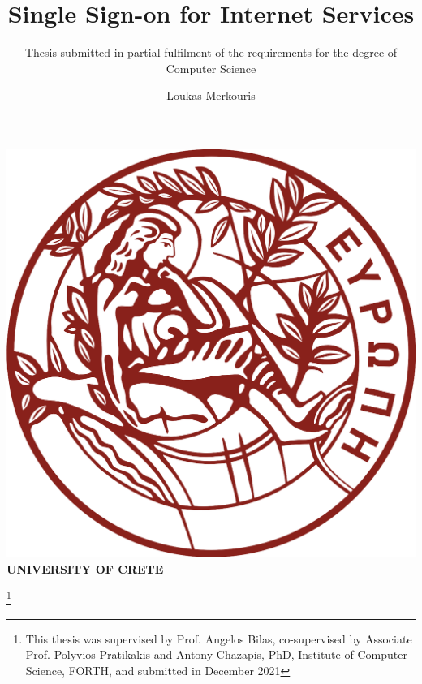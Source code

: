 \documentclass[acmsmall,screen,10pt,nonacm]{acmart}
\begin{document}
\begin{center}
\includegraphics[scale=0.2]{figures/UoC_logo.png}\\
\textcolor{UoC}{\textbf{UNIVERSITY OF CRETE}}
\vspace{3em}
\end{center}

\title{Single Sign-on for Internet Services}
\subtitle{Thesis submitted in partial fulfilment of the requirements for the degree of Computer Science}

\thanks{\small{This thesis was supervised by Prof. Angelos Bilas, co-supervised by Associate Prof. Polyvios Pratikakis and Antony Chazapis, PhD, Institute of Computer Science, FORTH, and submitted in December 2021}}

\author{Loukas Merkouris}

\renewcommand{\shortauthors}{L. Merkouris}
\end{document}
